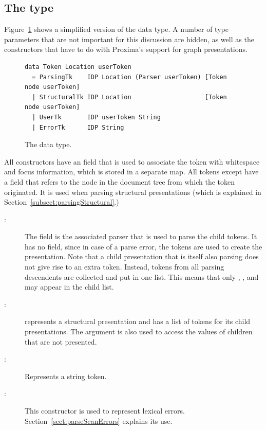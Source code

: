 \documentclass[12pt]{article}
\begin{document}

\subsection{The  type}

Figure~\ref{fig:tokenType} shows a simplified version of the  data type. A number of type parameters that are not important for this discussion are hidden, as well as the constructors that have to do with Proxima's support for graph presentations. 

\begin{figure}
\begin{center}
\begin{verbatim}
data Token Location userToken 
  = ParsingTk    IDP Location (Parser userToken) [Token node userToken]
  | StructuralTk IDP Location                    [Token node userToken]
  | UserTk       IDP userToken String 
  | ErrorTk      IDP String 
\end{verbatim}
\caption{The  data type.} \label{fig:tokenType} 
\end{center}
\end{figure}


All constructors have an  field that is used to associate the token with whitespace and focus information, which is stored in a separate map. All tokens except  have a  field that refers to the node in the document tree from which the token originated. It is used when parsing structural presentations (which is explained in Section~\ref{subsect:parsingStructural}.)

\begin{description}
\item[:] The field  is the associated parser that is used to parse the child tokens. It has no  field, since in case of a parse error, the tokens are used to create the presentation. Note that a child presentation that is itself also parsing does not give rise to an extra  token. Instead, tokens from all parsing descendents are collected and put in one list. This means that only , , and  may appear in the child list. \\
\item[:] represents a structural presentation and has a list of tokens for its child presentations. The  argument is also used to access the values of children that are not presented. 
\item[:] Represents a string token.  \\
\item[:] This constructor is used to represent lexical errors. Section~\ref{sect:parseScanErrors} explains its use. \\
\end{description}
\end{document}
